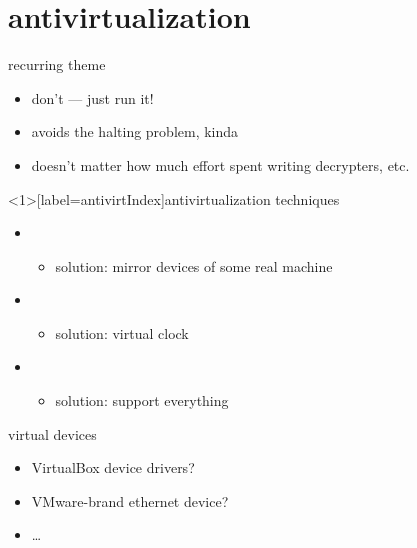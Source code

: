 \section{antivirtualization}


\begin{frame}{recurring theme}
    \begin{itemize}
    \item don't  --- just run it!
    \vspace{.5cm}
    \item avoids the halting problem, kinda
    \item doesn't matter how much effort spent writing decrypters, etc.
    \end{itemize}
\end{frame}

\begin{frame}<1>[label=antivirtIndex]{antivirtualization techniques}
    \begin{itemize}
    \item {}
        \begin{itemize}
        \item<3> solution: mirror devices of some real machine
        \end{itemize}
    \item {}
        \begin{itemize}
        \item<5> solution: virtual clock
        \end{itemize}
    \item {}
        \begin{itemize}
        \item<7> solution: support everything
        \end{itemize}
    \end{itemize}
\end{frame}


\begin{frame}{virtual devices}
    \begin{itemize}
    \item VirtualBox device drivers?
    \item VMware-brand ethernet device?
    \item \ldots
    \end{itemize}
\end{frame}

